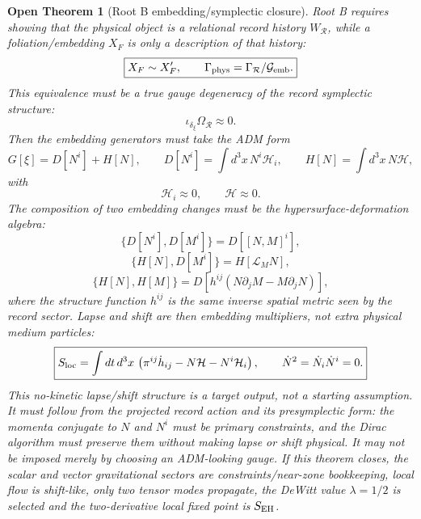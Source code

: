 \documentclass[11pt]{article}
\newtheorem{openthm}{Open Theorem}
\begin{document}
\begin{openthm}[Root B embedding/symplectic closure]
Root B requires showing that the physical object is a relational record
history \(W_{\mathcal R}\), while a foliation/embedding \(X_F\) is only a
description of that history:
\[
\boxed{
X_F\sim X'_F,
\qquad
\Gamma_{\rm phys}=\Gamma_{\mathcal R}/\mathcal G_{\rm emb}.
}
\]
This equivalence must be a true gauge degeneracy of the record symplectic
structure:
\[
\boxed{
\iota_{\delta_\xi}\Omega_{\mathcal R}\approx0.
}
\]
Then the embedding generators must take the ADM form
\[
\boxed{
G[\xi]=D[N^i]+H[N],
\qquad
D[N^i]=\int d^3x\,N^i\mathcal H_i,
\qquad
H[N]=\int d^3x\,N\mathcal H,
}
\]
with
\[
\boxed{
\mathcal H_i\approx0,
\qquad
\mathcal H\approx0.
}
\]
The composition of two embedding changes must be the hypersurface-deformation
algebra:
\[
\boxed{
\{D[N^i],D[M^i]\}=D[[N,M]^i],
}
\]
\[
\boxed{
\{H[N],D[M^i]\}=H[\mathcal L_MN],
}
\]
\[
\boxed{
\{H[N],H[M]\}
=
D\!\left[h^{ij}(N\partial_jM-M\partial_jN)\right],
}
\]
where the structure function \(h^{ij}\) is the same inverse spatial metric
seen by the record sector.  Lapse and shift are then embedding multipliers,
not extra physical medium particles:
\[
\boxed{
S_{\rm loc}
=
\int dt\,d^3x\,
\left(\pi^{ij}\dot h_{ij}-N\mathcal H-N^i\mathcal H_i\right),
\qquad
\dot N^2=\dot N_i\dot N^i=0.
}
\]
This no-kinetic lapse/shift structure is a target output, not a starting
assumption.  It must follow from the projected record action and its
presymplectic form: the momenta conjugate to \(N\) and \(N^i\) must be primary
constraints, and the Dirac algorithm must preserve them without making lapse
or shift physical.  It may not be imposed merely by choosing an ADM-looking
gauge.
If this theorem closes, the scalar and vector gravitational sectors are
constraints/near-zone bookkeeping, local flow is shift-like, only two tensor
modes propagate, the DeWitt value \(\lambda=1/2\) is selected and the
two-derivative local fixed point is \(S_{\rm EH}\).
\end{openthm}
\end{document}
